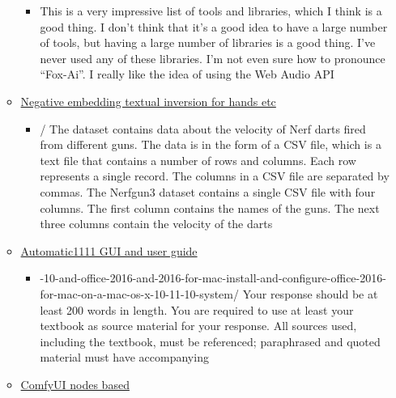 \begin{itemize}
\begin{itemize}
    \begin{itemize}
    
    \item
      This is a very impressive list of tools and libraries, which I
      think is a good thing. I don't think that it's a good idea to have
      a large number of tools, but having a large number of libraries is
      a good thing. I've never used any of these libraries. I'm not even
      sure how to pronounce ``Fox-Ai''. I really like the idea of using
      the Web Audio API
    \end{itemize}
  \item
    \href{https://huggingface.co/datasets/Nerfgun3/bad_prompt}{Negative
    embedding textual inversion for hands etc}

    \begin{itemize}
    
    \item
      / The dataset contains data about the velocity of Nerf darts fired
      from different guns. The data is in the form of a CSV file, which
      is a text file that contains a number of rows and columns. Each
      row represents a single record. The columns in a CSV file are
      separated by commas. The Nerfgun3 dataset contains a single CSV
      file with four columns. The first column contains the names of the
      guns. The next three columns contain the velocity of the darts
    \end{itemize}
  \item
    \href{https://www.thosesixfaces.com/post/stable-diffusion-getting-started-windows}{Automatic1111
    GUI and user guide}

    \begin{itemize}
    
    \item
      -10-and-office-2016-and-2016-for-mac-install-and-configure-office-2016-for-mac-on-a-mac-os-x-10-11-10-system/
      Your response should be at least 200 words in length. You are
      required to use at least your textbook as source material for your
      response. All sources used, including the textbook, must be
      referenced; paraphrased and quoted material must have accompanying
    \end{itemize}
  \item
    \href{https://github.com/comfyanonymous/ComfyUI}{ComfyUI nodes
    based}

    \begin{itemize}
    

\end{itemize}
\end{itemize}
\end{itemize}
